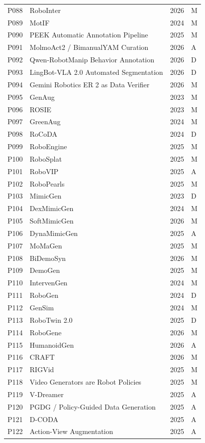 \begin{longtable}{@{}p{1.3cm}p{11.8cm}p{2.2cm}p{1.2cm}@{}}
P088 & RoboInter & 2026 & M \\
P089 & MotIF & 2024 & M \\
P090 & PEEK Automatic Annotation Pipeline & 2025 & M \\
P091 & MolmoAct2 / BimanualYAM Curation & 2026 & A \\
P092 & Qwen-RobotManip Behavior Annotation & 2026 & D \\
P093 & LingBot-VLA 2.0 Automated Segmentation & 2026 & D \\
P094 & Gemini Robotics ER 2 as Data Verifier & 2026 & M \\
P095 & GenAug & 2023 & M \\
P096 & ROSIE & 2023 & M \\
P097 & GreenAug & 2024 & M \\
P098 & RoCoDA & 2024 & D \\
P099 & RoboEngine & 2025 & M \\
P100 & RoboSplat & 2025 & M \\
P101 & RoboVIP & 2025 & A \\
P102 & RoboPearls & 2025 & M \\
P103 & MimicGen & 2023 & D \\
P104 & DexMimicGen & 2024 & M \\
P105 & SoftMimicGen & 2026 & M \\
P106 & DynaMimicGen & 2025 & A \\
P107 & MoMaGen & 2025 & M \\
P108 & BiDemoSyn & 2026 & M \\
P109 & DemoGen & 2025 & M \\
P110 & IntervenGen & 2024 & M \\
P111 & RoboGen & 2024 & D \\
P112 & GenSim & 2024 & M \\
P113 & RoboTwin 2.0 & 2025 & D \\
P114 & RoboGene & 2026 & M \\
P115 & HumanoidGen & 2026 & A \\
P116 & CRAFT & 2026 & M \\
P117 & RIGVid & 2025 & M \\
P118 & Video Generators are Robot Policies & 2025 & M \\
P119 & V-Dreamer & 2025 & A \\
P120 & PGDG / Policy-Guided Data Generation & 2025 & A \\
P121 & D-CODA & 2025 & A \\
P122 & Action-View Augmentation & 2025 & A \\

\end{longtable}
